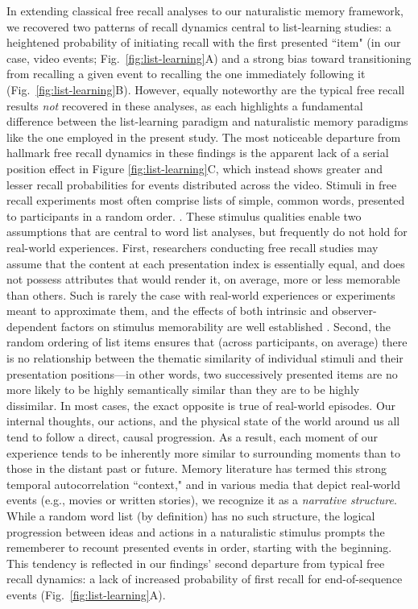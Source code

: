 \documentclass{article}
\begin{document}
In extending classical free recall analyses to our naturalistic memory framework, we recovered two patterns of recall dynamics central to list-learning studies: a heightened probability of initiating recall with the first presented ``item" (in our case, video events; Fig.~\ref{fig:list-learning}A) and a strong bias toward transitioning from recalling a given event to recalling the one immediately following it (Fig.~\ref{fig:list-learning}B).  However, equally noteworthy are the typical free recall results \textit{not} recovered in these analyses, as each highlights a fundamental difference between the list-learning paradigm and naturalistic memory paradigms like the one employed in the present study.  The most noticeable departure from hallmark free recall dynamics in these findings is the apparent lack of a serial position effect in Figure \ref{fig:list-learning}C, which instead shows greater and lesser recall probabilities for events distributed across the video.  Stimuli in free recall experiments most often comprise lists of simple, common words, presented to participants in a random order. \citep[In fact, numerous word pools have been developed based on these criteria; e.g.,][]{FrieEtal82}.  These stimulus qualities enable two assumptions that are central to word list analyses, but frequently do not hold for real-world experiences.  First, researchers conducting free recall studies may assume that the content at each presentation index is essentially equal, and does not possess attributes that would render it, on average, more or less memorable than others.  Such is rarely the case with real-world experiences or experiments meant to approximate them, and the effects of both intrinsic and observer-dependent factors on stimulus memorability are well established \citep[for review see][]{ChunTurk07, ByliEtal15, TyngEtal17}.  Second, the random ordering of list items ensures that (across participants, on average) there is no relationship between the thematic similarity of individual stimuli and their presentation positions---in other words, two successively presented items are no more likely to be highly semantically similar than they are to be highly dissimilar.  In most cases, the exact opposite is true of real-world episodes.  Our internal thoughts, our actions, and the physical state of the world around us all tend to follow a direct, causal progression.  As a result, each moment of our experience tends to be inherently more similar to surrounding moments than to those in the distant past or future.  Memory literature has termed this strong temporal autocorrelation ``context," and in various media that depict real-world events (e.g., movies or written stories), we recognize it as a \textit{narrative structure}.  While a random word list (by definition) has no such structure, the logical progression between ideas and actions in a naturalistic stimulus prompts the rememberer to recount presented events in order, starting with the beginning.  This tendency is reflected in our findings' second departure from typical free recall dynamics: a lack of increased probability of first recall for end-of-sequence events (Fig.~\ref{fig:list-learning}A).
\end{document}
